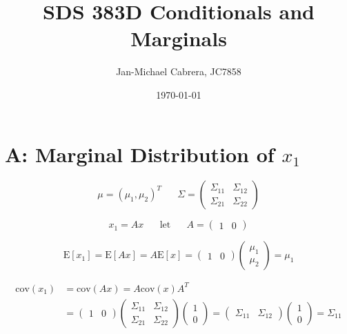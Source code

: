 \documentclass[12pt]{article}
\newcommand{\cov}{\text{cov}}
\newcommand{\E}{\text{E}}
\begin{document}
    \title{SDS 383D Conditionals and Marginals}
    \author{Jan-Michael Cabrera, JC7858}
    \date{\today}
    \maketitle

    \section*{A: Marginal Distribution of $x_1$}

        \begin{equation}
            \mu = (\mu_1, \mu_2)^T \hspace{20pt} \Sigma = \begin{pmatrix}
                                                            \Sigma_{11} & \Sigma_{12} \\
                                                            \Sigma_{21} & \Sigma_{22}
                                                        \end{pmatrix}
        \end{equation}

        \begin{equation}
            x_1 = Ax \hspace{20pt} \text{let} \hspace{20pt} A = \begin{pmatrix}
            1 & 0 
            \end{pmatrix}
        \end{equation}

        \begin{equation}
            \E[x_1] = \E[Ax] = A \E[x] = \begin{pmatrix} 1 & 0 \end{pmatrix} \begin{pmatrix} \mu_1 \\ \mu_2\end{pmatrix} = \mu_1
        \end{equation}

        \begin{align}
            \cov(x_1) &= \cov(Ax) = A \cov(x) A^T \\
            &= \begin{pmatrix} 1 & 0 \end{pmatrix} \begin{pmatrix} \Sigma_{11} & \Sigma_{12} \\\Sigma_{21} & \Sigma_{22} \end{pmatrix} \begin{pmatrix} 1 \\ 0 \end{pmatrix} = \begin{pmatrix} \Sigma_{11} & \Sigma_{12} \end{pmatrix}\begin{pmatrix} 1 \\ 0 \end{pmatrix} = \Sigma_{11}
         \end{align}
\end{document}
